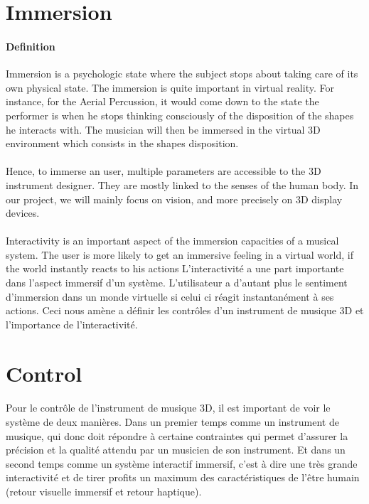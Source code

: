 \newpage
\section{Immersion}
\paragraph{Definition}
Immersion is a psychologic state where the subject stops about taking care of its own physical state.
The immersion is quite important in virtual reality. For instance, for the Aerial Percussion, it would come down to the state the performer is when he stops thinking consciously of the disposition of the shapes he interacts with. The musician will then be immersed in the virtual 3D environment which consists in the shapes disposition.

\paragraph{}
Hence, to immerse an user, multiple parameters are accessible to the 3D instrument designer. 
They are mostly linked to the senses of the human body. In our project, we will mainly focus on vision, and more precisely on 3D display devices.

\paragraph{}
Interactivity is an important aspect of the immersion capacities of a musical system.
The user is more likely to get an immersive feeling in a virtual world, if the world instantly reacts to his actions
L'interactivité a une part importante dans l'aspect immersif d'un système. L'utilisateur a d'autant plus le sentiment d'immersion dans un monde virtuelle si celui ci réagit instantanément à ses actions. Ceci nous amène a définir les contrôles d'un instrument de musique 3D et l'importance de l'interactivité.

\section{Control}
\paragraph{}
Pour le contrôle de l'instrument de musique 3D, il est important de voir le système de deux manières. Dans un premier temps comme un instrument de musique, qui donc doit répondre à certaine contraintes qui permet d'assurer la précision et la qualité attendu par un musicien de son instrument. Et dans un second temps comme un système interactif immersif, c'est à dire une très grande interactivité et de tirer profits un maximum des caractéristiques de l'être humain (retour visuelle immersif et retour haptique).

